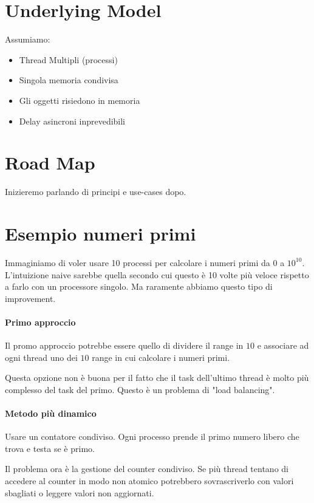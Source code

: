 \documentclass{article}
\begin{document}
\section{Underlying Model}
Assumiamo:
\begin{itemize}
    \item Thread Multipli (processi)
    \item Singola memoria condivisa
    \item Gli oggetti risiedono in memoria
    \item Delay asincroni inprevedibili
\end{itemize}

\section{Road Map}
Inizieremo parlando di principi e use-cases dopo.

\section{Esempio numeri primi}
Immaginiamo di voler usare 10 processi per calcolare i numeri primi da $0$ a $10^10$. \\
L'intuizione naive sarebbe quella secondo cui questo è 10 volte più veloce rispetto a farlo con un processore singolo. Ma raramente abbiamo questo tipo di improvement.

\paragraph{Primo approccio}
Il promo approccio potrebbe essere quello di dividere il range in $10$ e associare ad ogni thread uno dei $10$ range in cui calcolare i numeri primi.

Questa opzione non è buona per il fatto che il task dell'ultimo thread è molto più complesso del task del primo. Questo è un problema di "load balancing".

\paragraph{Metodo più dinamico}
Usare un contatore condiviso. Ogni processo prende il primo numero libero che trova e testa se è primo. 

Il problema ora è la gestione del counter condiviso. Se più thread tentano di accedere al counter in modo non atomico potrebbero sovrascriverlo con valori sbagliati o leggere valori non aggiornati.
\end{document}
